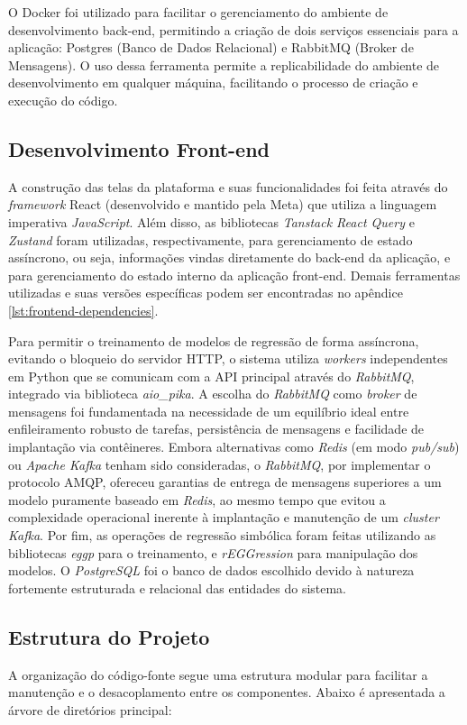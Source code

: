 O Docker foi utilizado para facilitar o gerenciamento do ambiente de desenvolvimento back-end, permitindo a criação de dois serviços essenciais para a aplicação: Postgres (Banco de Dados Relacional) e RabbitMQ (Broker de Mensagens). O uso dessa ferramenta permite a replicabilidade do ambiente de desenvolvimento em qualquer máquina, facilitando o processo de criação e execução do código.

\subsection{Desenvolvimento Front-end}
A construção das telas da plataforma e suas funcionalidades foi feita através do \textit{framework} React (desenvolvido e mantido pela Meta) que utiliza a linguagem imperativa \textit{JavaScript}. Além disso, as bibliotecas \textit{Tanstack React Query} e \textit{Zustand} foram utilizadas, respectivamente, para gerenciamento de estado assíncrono, ou seja, informações vindas diretamente do back-end da aplicação, e para gerenciamento do estado interno da aplicação front-end. Demais ferramentas utilizadas e suas versões específicas podem ser encontradas no apêndice \ref{lst:frontend-dependencies}.

Para permitir o treinamento de modelos de regressão de forma assíncrona, evitando o bloqueio do servidor HTTP, o sistema utiliza \textit{workers} independentes em Python que se comunicam com a API principal através do \textit{RabbitMQ}, integrado via biblioteca \textit{aio\_pika}. A escolha do \textit{RabbitMQ} como \textit{broker} de mensagens foi fundamentada na necessidade de um equilíbrio ideal entre enfileiramento robusto de tarefas, persistência de mensagens e facilidade de implantação via contêineres. Embora alternativas como \textit{Redis} (em modo \textit{pub/sub}) ou \textit{Apache Kafka} tenham sido consideradas, o \textit{RabbitMQ}, por implementar o protocolo AMQP, ofereceu garantias de entrega de mensagens superiores a um modelo puramente baseado em \textit{Redis}, ao mesmo tempo que evitou a complexidade operacional inerente à implantação e manutenção de um \textit{cluster Kafka}. Por fim, as operações de regressão simbólica foram feitas utilizando as bibliotecas \textit{eggp} para o treinamento, e \textit{rEGGression} para manipulação dos modelos. O \textit{PostgreSQL} foi o banco de dados escolhido devido à natureza fortemente estruturada e relacional das entidades do sistema.

\subsection{Estrutura do Projeto}
A organização do código-fonte segue uma estrutura modular para facilitar a manutenção e o desacoplamento entre os componentes. Abaixo é apresentada a árvore de diretórios principal:

